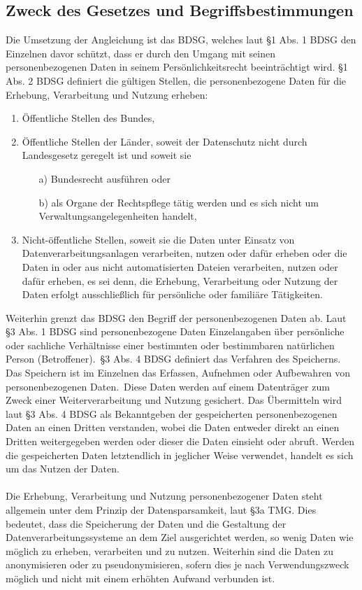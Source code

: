 \subsection{Zweck des Gesetzes und Begriffsbestimmungen}
Die Umsetzung der Angleichung ist das BDSG, welches laut \S 1 Abs. 1 BDSG den Einzelnen davor schützt, dass er durch den Umgang mit seinen personenbezogenen Daten in seinem Persönlichkeitsrecht beeinträchtigt wird. \S 1 Abs. 2 BDSG definiert die gültigen Stellen, die personenbezogene Daten für die Erhebung, Verarbeitung und Nutzung erheben:
\begin{enumerate}
\item Öffentliche Stellen des Bundes,
\item Öffentliche Stellen der Länder, soweit der Datenschutz nicht durch Landesgesetz geregelt ist und soweit sie
\begin{itemize}
\item[a)] Bundesrecht ausführen oder
\item[b)] als Organe der Rechtspflege tätig werden und es sich nicht um Verwaltungsangelegenheiten handelt,
\end{itemize}
\item Nicht-öffentliche Stellen, soweit sie die Daten unter Einsatz von Datenverarbeitungsanlagen verarbeiten, nutzen oder dafür erheben oder die Daten in oder aus nicht automatisierten Dateien verarbeiten, nutzen oder dafür erheben, es sei denn, die Erhebung, Verarbeitung oder Nutzung der Daten erfolgt ausschließlich für persönliche oder familiäre Tätigkeiten.
\end{enumerate}
Weiterhin grenzt das BDSG den Begriff der personenbezogenen Daten ab. Laut \S 3 Abs. 1 BDSG \glqq sind personenbezogene Daten Einzelangaben über persönliche oder sachliche Verhältnisse einer bestimmten oder bestimmbaren natürlichen Person (Betroffener).\grqq \ \S 3 Abs. 4 BDSG definiert das Verfahren des Speicherns. Das Speichern ist im Einzelnen das \glqq Erfassen, Aufnehmen oder Aufbewahren von personenbezogenen Daten.\grqq \ Diese Daten werden auf einem Datenträger zum Zweck einer Weiterverarbeitung und Nutzung gesichert. Das Übermitteln wird laut \S 3 Abs. 4 BDSG als Bekanntgeben der gespeicherten personenbezogenen Daten an einen Dritten verstanden, wobei die Daten entweder direkt an einen Dritten weitergegeben werden oder dieser die Daten einsieht oder abruft. Werden die gespeicherten Daten letztendlich in jeglicher Weise verwendet, handelt es sich um das Nutzen der Daten.\\
\\Die Erhebung, Verarbeitung und Nutzung personenbezogener Daten steht allgemein unter dem Prinzip der Datensparsamkeit, laut \S 3a TMG. Dies bedeutet, dass die Speicherung der Daten und die Gestaltung der Datenverarbeitungssysteme an dem Ziel ausgerichtet werden, so wenig Daten wie möglich zu erheben, verarbeiten und zu nutzen. Weiterhin sind die Daten zu anonymisieren oder zu pseudonymisieren, sofern dies je nach Verwendungszweck möglich und nicht mit einem erhöhten Aufwand verbunden ist.
